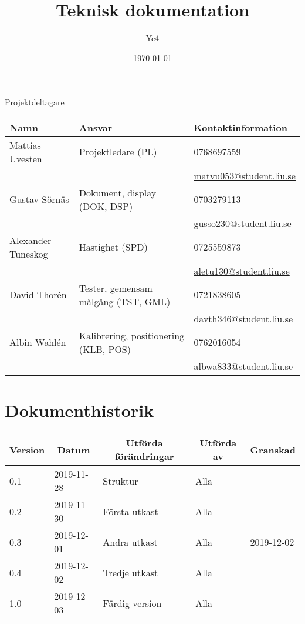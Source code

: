 \documentclass[10pt,oneside,swedish]{lips-no_customer}
\title{Teknisk dokumentation}
\author{Yc4}
\date{\today}
\begin{document}
\maketitle

\cleardoublepage
\makeprojectid

\begin{center}
  \Large Projektdeltagare
\end{center}
\begin{center}
  \begin{tabular}{|l|l|l|}
    \hline
			\textbf{Namn} & \textbf{Ansvar} & \textbf{Kontaktinformation}\\
		\hline
			Mattias Uvesten & Projektledare (PL) & 0768697559\\
			&& \url{matvu053@student.liu.se} \\
    \hline
			Gustav Sörnäs & Dokument, display (DOK, DSP) & 0703279113\\
			&& \url{gusso230@student.liu.se} \\
    \hline
			Alexander Tuneskog & Hastighet (SPD) & 0725559873 \\
			&& \url{aletu130@student.liu.se} \\
    \hline
			David Thorén & Tester, gemensam målgång (TST, GML) & 0721838605 \\
			&& \url{davth346@student.liu.se} \\
    \hline
			Albin Wahlén & Kalibrering, positionering (KLB, POS) & 0762016054 \\
			&& \url{albwa833@student.liu.se} \\
    \hline
  \end{tabular}
\end{center}

\section*{Dokumenthistorik}
\begin{tabular}{|p{}|p{}|p{}|p{}|p{}|} 
	\hline
  \multicolumn{1}{|c}{\bfseries Version} & 
  \multicolumn{1}{|c}{\bfseries Datum} & 
  \multicolumn{1}{|c}{\bfseries Utförda förändringar} & 
  \multicolumn{1}{|c}{\bfseries Utförda av} & 
	\multicolumn{1}{|c|}{\bfseries Granskad}\\
  \hline
	\hline
		0.1 & 2019-11-28 & Struktur & Alla & \\
  \hline
		0.2 & 2019-11-30 & Första utkast & Alla & \\
  \hline
		0.3 & 2019-12-01 & Andra utkast & Alla & 2019-12-02 \\
  \hline
 		0.4 & 2019-12-02 & Tredje utkast & Alla & \\
  \hline
		1.0 & 2019-12-03 & Färdig version & Alla & \\
	\hline
  
\end{tabular}
\end{document}
